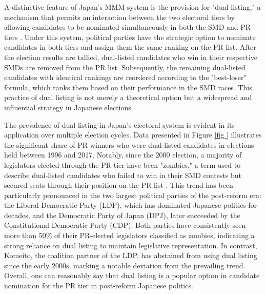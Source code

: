 \documentclass[a4paper, 11pt]{article}
\begin{document}
A distinctive feature of Japan's MMM system is the provision for "dual listing," a mechanism that permits an interaction between the two electoral tiers by allowing candidates to be nominated simultaneously in both the SMD and PR tiers \citep{matland_determinants_2004, pekkanen2006electoral, reed2022}.\footnotemark{}  Under this system, political parties have the strategic option to nominate candidates in both tiers and assign them the same ranking on the PR list. After the election results are tallied, dual-listed candidates who win in their respective SMDs are removed from the PR list. Subsequently, the remaining dual-listed candidates with identical rankings are reordered according to the "best-loser" formula, which ranks them based on their performance in the SMD races. This practice of dual listing is not merely a theoretical option but a widespread and influential strategy in Japanese elections.

The prevalence of dual listing in Japan's electoral system is evident in its application over multiple election cycles. Data presented in Figure \ref{fig
} illustrates the significant share of PR winners who were dual-listed candidates in elections held between 1996 and 2017. Notably, since the 2000 election, a majority of legislators elected through the PR tier have been "zombies," a term used to describe dual-listed candidates who failed to win in their SMD contests but secured seats through their position on the PR list \citep{pekkanen2006electoral}. This trend has been particularly pronounced in the two largest political parties of the post-reform era: the Liberal Democratic Party (LDP), which has dominated Japanese politics for decades, and the Democratic Party of Japan (DPJ), later succeeded by the Constitutional Democratic Party (CDP). Both parties have consistently seen more than 50\% of their PR-elected legislators classified as zombies, indicating a strong reliance on dual listing to maintain legislative representation. In contrast, Komeito, the coalition partner of the LDP, has abstained from using dual listing since the early 2000s, marking a notable deviation from the prevailing trend. Overall, one can reasonably say that dual listing is a popular option in candidate nomination for the PR tier in post-reform Japanese politics. 

\end{document}
